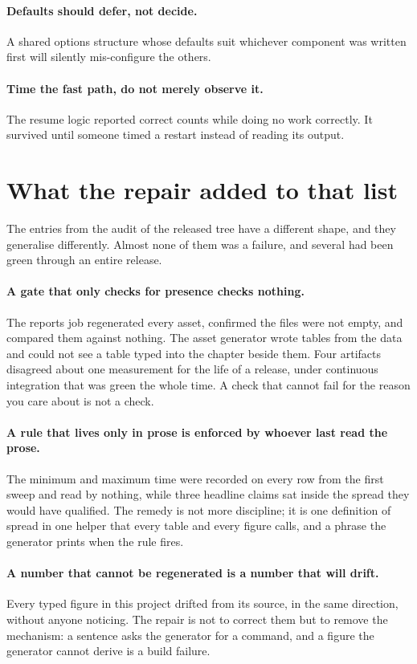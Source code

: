 \documentclass[11pt,a4paper]{report}
\begin{document}
\paragraph{Defaults should defer, not decide.} A shared options structure whose
defaults suit whichever component was written first will silently mis-configure
the others.

\paragraph{Time the fast path, do not merely observe it.} The resume logic
reported correct counts while doing no work correctly. It survived until someone
timed a restart instead of reading its output.

\section{What the repair added to that list}

The entries from the audit of the released tree have a different shape, and they
generalise differently. Almost none of them was a failure, and several had been
green through an entire release.

\paragraph{A gate that only checks for presence checks nothing.} The reports job
regenerated every asset, confirmed the files were not empty, and compared them
against nothing. The asset generator wrote tables from the data and could not see
a table typed into the chapter beside them. Four artifacts disagreed about one
measurement for the life of a release, under continuous integration that was
green the whole time. A check that cannot fail for the reason you care about is
not a check.

\paragraph{A rule that lives only in prose is enforced by whoever last read the
prose.} The minimum and maximum time were recorded on every row from the first
sweep and read by nothing, while three headline claims sat inside the spread they
would have qualified. The remedy is not more discipline; it is one definition of
spread in one helper that every table and every figure calls, and a phrase the
generator prints when the rule fires.

\paragraph{A number that cannot be regenerated is a number that will drift.}
Every typed figure in this project drifted from its source, in the same
direction, without anyone noticing. The repair is not to correct them but to
remove the mechanism: a sentence asks the generator for a command, and a figure
the generator cannot derive is a build failure.
\end{document}
